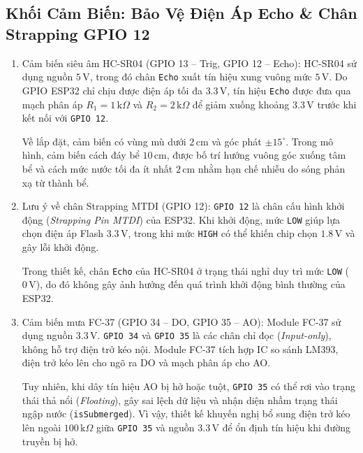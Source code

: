 \subsection{Khối Cảm Biến: Bảo Vệ Điện Áp Echo \& Chân Strapping GPIO 12}
\label{subsec:sensor_circuit_design}
\begin{enumerate}
    \item Cảm biến siêu âm HC-SR04 (GPIO 13 -- Trig, GPIO 12 -- Echo):
    HC-SR04 sử dụng nguồn $5\,\text{V}$, trong đó chân \texttt{Echo} xuất tín hiệu xung vuông mức $5\,\text{V}$. Do GPIO ESP32 chỉ chịu được điện áp tối đa $3.3\,\text{V}$, tín hiệu \texttt{Echo} được đưa qua mạch phân áp $R_1 = 1\,\text{k}\Omega$ và $R_2 = 2\,\text{k}\Omega$ để giảm xuống khoảng $3.3\,\text{V}$ trước khi kết nối với \texttt{GPIO 12}.
    
    Về lắp đặt, cảm biến có vùng mù dưới $2\,\text{cm}$ và góc phát $\pm 15^\circ$. Trong mô hình, cảm biến cách đáy bể $10\,\text{cm}$, được bố trí hướng vuông góc xuống tâm bể và cách mức nước tối đa ít nhất $2\,\text{cm}$ nhằm hạn chế nhiễu do sóng phản xạ từ thành bể.

    \item Lưu ý về chân Strapping MTDI (GPIO 12):
    \texttt{GPIO 12} là chân cấu hình khởi động (\textit{Strapping Pin MTDI}) của ESP32. Khi khởi động, mức \texttt{LOW} giúp lựa chọn điện áp Flash $3.3\,\text{V}$, trong khi mức \texttt{HIGH} có thể khiến chip chọn $1.8\,\text{V}$ và gây lỗi khởi động.
    
    Trong thiết kế, chân \texttt{Echo} của HC-SR04 ở trạng thái nghỉ duy trì mức \texttt{LOW} ($0\,\text{V}$), do đó không gây ảnh hưởng đến quá trình khởi động bình thường của ESP32.

    \item Cảm biến mưa FC-37 (GPIO 34 -- DO, GPIO 35 -- AO):
    Module FC-37 sử dụng nguồn $3.3\,\text{V}$. \texttt{GPIO 34} và \texttt{GPIO 35} là các chân chỉ đọc (\textit{Input-only}), không hỗ trợ điện trở kéo nội. Module FC-37 tích hợp IC so sánh LM393, điện trở kéo lên cho ngõ ra DO và mạch phân áp cho AO.
    
    Tuy nhiên, khi dây tín hiệu AO bị hở hoặc tuột, \texttt{GPIO 35} có thể rơi vào trạng thái thả nổi (\textit{Floating}), gây sai lệch dữ liệu và nhận diện nhầm trạng thái ngập nước (\texttt{isSubmerged}). Vì vậy, thiết kế khuyến nghị bổ sung điện trở kéo lên ngoài $100\,\text{k}\Omega$ giữa \texttt{GPIO 35} và nguồn $3.3\,\text{V}$ để ổn định tín hiệu khi đường truyền bị hở.
\end{enumerate}

